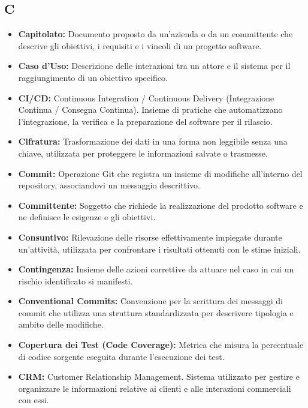 
{}
\subsection*{C}

\begin{itemize}
    \item \textbf{Capitolato:} Documento proposto da un'azienda o da un committente che descrive gli obiettivi, i requisiti e i vincoli di un progetto software.
    \item \textbf{Caso d'Uso:} Descrizione delle interazioni tra un attore e il sistema per il raggiungimento di un obiettivo specifico.
    \item \textbf{CI/CD:} Continuous Integration / Continuous Delivery (Integrazione Continua / Consegna Continua). Insieme di pratiche che automatizzano l'integrazione, la verifica e la preparazione del software per il rilascio.
    \item \textbf{Cifratura:} Trasformazione dei dati in una forma non leggibile senza una chiave, utilizzata per proteggere le informazioni salvate o trasmesse.
    \item \textbf{Commit:} Operazione Git che registra un insieme di modifiche all'interno del repository, associandovi un messaggio descrittivo.
    \item \textbf{Committente:} Soggetto che richiede la realizzazione del prodotto software e ne definisce le esigenze e gli obiettivi.
    \item \textbf{Consuntivo:} Rilevazione delle risorse effettivamente impiegate durante un'attività, utilizzata per confrontare i risultati ottenuti con le stime iniziali.
    \item \textbf{Contingenza:} Insieme delle azioni correttive da attuare nel caso in cui un rischio identificato si manifesti.
    \item \textbf{Conventional Commits:} Convenzione per la scrittura dei messaggi di commit che utilizza una struttura standardizzata per descrivere tipologia e ambito delle modifiche.
    \item \textbf{Copertura dei Test (Code Coverage):} Metrica che misura la percentuale di codice sorgente eseguita durante l'esecuzione dei test.
    \item \textbf{CRM:} Customer Relationship Management. Sistema utilizzato per gestire e organizzare le informazioni relative ai clienti e alle interazioni commerciali con essi.
\end{itemize}

